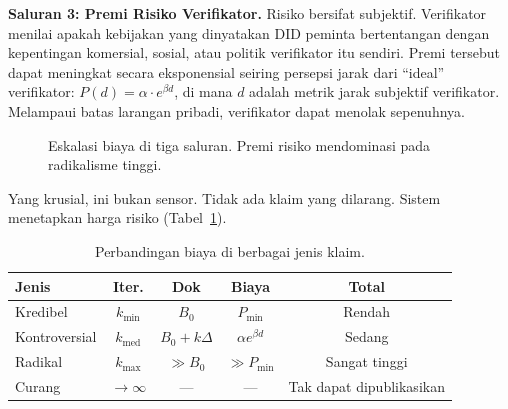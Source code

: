 \documentclass[11pt,a4paper,twocolumn]{article}
\begin{document}
\textbf{Saluran 3: Premi Risiko Verifikator.} Risiko bersifat subjektif. Verifikator menilai apakah kebijakan yang dinyatakan DID peminta bertentangan dengan kepentingan komersial, sosial, atau politik verifikator itu sendiri. Premi tersebut dapat meningkat secara eksponensial seiring persepsi jarak dari ``ideal'' verifikator: $P(d) = \alpha \cdot e^{\beta d}$, di mana $d$ adalah metrik jarak subjektif verifikator. Melampaui batas larangan pribadi, verifikator dapat menolak sepenuhnya.

\begin{figure}[ht]
\centering
{}
\caption{Eskalasi biaya di tiga saluran. Premi risiko mendominasi pada radikalisme tinggi.}
\label{fig:radicalism}
\end{figure}

Yang krusial, ini bukan sensor. Tidak ada klaim yang dilarang. Sistem menetapkan harga risiko (Tabel~\ref{tab:costs}).

\begin{table}[ht]
\centering
\caption{Perbandingan biaya di berbagai jenis klaim.}
\label{tab:costs}
\footnotesize
\begin{tabular}{@{}lcccc@{}}
\toprule
\textbf{Jenis} & \textbf{Iter.} & \textbf{Dok} & \textbf{Biaya} & \textbf{Total} \\
\midrule
Kredibel & $k_{\min}$ & $B_0$ & $P_{\min}$ & Rendah \\
Kontroversial & $k_{\text{med}}$ & $B_0{+}k\Delta$ & $\alpha e^{\beta d}$ & Sedang \\
Radikal & $k_{\max}$ & $\gg B_0$ & $\gg P_{\min}$ & Sangat tinggi \\
Curang & $\to\infty$ & --- & --- & Tak dapat dipublikasikan \\
\bottomrule
\end{tabular}
\end{table}
\end{document}
